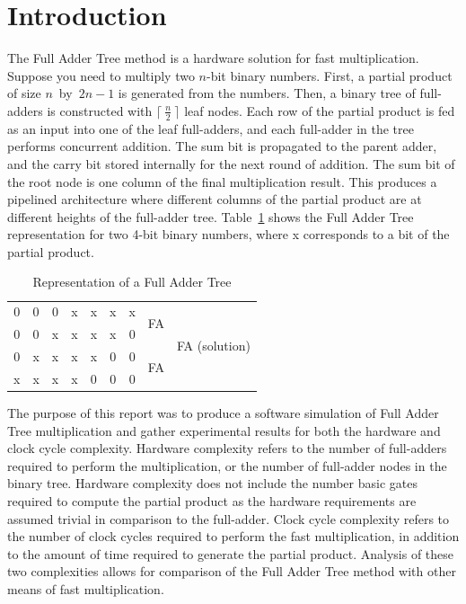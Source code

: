 \documentclass{article}
\begin{document}
\section{Introduction}
The Full Adder Tree method is a hardware solution for fast multiplication. Suppose you need to multiply two $n$-bit binary numbers. First, a partial product of size $n$~by~$2n-1$ is generated from the numbers. Then, a binary tree of full-adders is constructed with $\lceil~\frac{n}{2}~\rceil$ leaf nodes. Each row of the partial product is fed as an input into one of the leaf full-adders, and each full-adder in the tree performs concurrent addition. The sum bit is propagated to the parent adder, and the carry bit stored internally for the next round of addition. The sum bit of the root node is one column of the final multiplication result. This produces a pipelined architecture where different columns of the partial product are at different heights of the full-adder tree. Table~\ref{FAT_Representation} shows the Full Adder Tree representation for two 4-bit binary numbers, where x corresponds to a bit of the partial product.

\begin{table}[h]
	\begin{center}
	\begin{tabular}{ *{7}{c} | *{2}{c} }
		0&0&0&x&x&x&x & \multirow{2}{*}{FA} & \multirow{4}{*}{FA (solution)} \\
		0&0&x&x&x&x&0 & \\
		0&x&x&x&x&0&0 & \multirow{2}{*}{FA} \\
		x&x&x&x&0&0&0 & \\
	\end{tabular}
	\end{center}
	\caption{Representation of a Full Adder Tree}
	\label{FAT_Representation}
\end{table}

The purpose of this report was to produce a software simulation of Full Adder Tree multiplication and gather experimental results for both the hardware and clock cycle complexity. Hardware complexity refers to the number of full-adders required to perform the multiplication, or the number of full-adder nodes in the binary tree. Hardware complexity does not include the number basic gates required to compute the partial product as the hardware requirements are assumed trivial in comparison to the full-adder. Clock cycle complexity refers to the number of clock cycles required to perform the fast multiplication, in addition to the amount of time required to generate the partial product. Analysis of these two complexities allows for comparison of the Full Adder Tree method with other means of fast multiplication.
\end{document}
